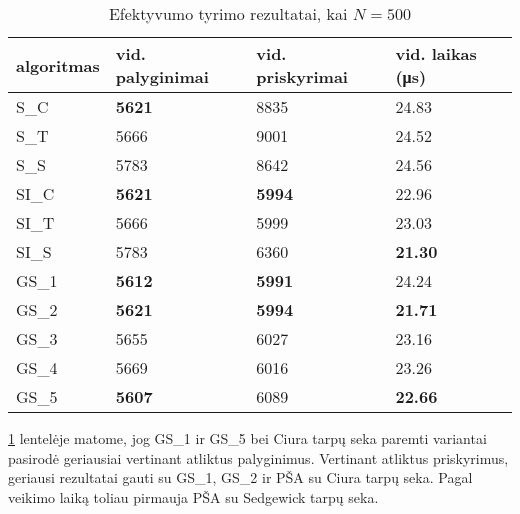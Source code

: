 \documentclass{VUMIFInfKursinis}
\begin{document}
\begin{table}[H]
  \caption{Efektyvumo tyrimo rezultatai, kai $N = 500$}
  \label{results_500}
  \centering
  \begin{tabular}{@{}llll@{}}
  algoritmas & vid. palyginimai                      & vid. priskyrimai                      & vid. laikas (μs)                       \\ \midrule
  S\_C       & \cellcolor[HTML]{70AD47}\textbf{5621} & 8835                                  & 24.83                                  \\
  S\_T       & 5666                                  & 9001                                  & 24.52                                  \\
  S\_S       & 5783                                  & 8642                                  & 24.56                                  \\
  SI\_C      & \cellcolor[HTML]{70AD47}\textbf{5621} & \cellcolor[HTML]{70AD47}\textbf{5994} & 22.96                                  \\
  SI\_T      & 5666                                  & 5999                                  & 23.03                                  \\
  SI\_S      & 5783                                  & 6360                                  & \cellcolor[HTML]{70AD47}\textbf{21.30} \\
  GS\_1      & \cellcolor[HTML]{70AD47}\textbf{5612} & \cellcolor[HTML]{70AD47}\textbf{5991} & 24.24                                  \\
  GS\_2 & \cellcolor[HTML]{70AD47}\textbf{5621} & \cellcolor[HTML]{70AD47}\textbf{5994} & \cellcolor[HTML]{70AD47}\textbf{21.71} \\
  GS\_3      & 5655                                  & 6027                                  & 23.16                                  \\
  GS\_4      & 5669                                  & 6016                                  & 23.26                                  \\
  GS\_5      & \cellcolor[HTML]{70AD47}\textbf{5607} & 6089                                  & \cellcolor[HTML]{70AD47}\textbf{22.66} \\  \bottomrule 
  \end{tabular}
\end{table}


\ref{results_500} lentelėje matome, jog
GS\_1 ir GS\_5 bei Ciura tarpų seka paremti variantai pasirodė geriausiai vertinant atliktus palyginimus.
Vertinant atliktus priskyrimus, geriausi rezultatai gauti su GS\_1, GS\_2 ir PŠA su Ciura tarpų seka.
Pagal veikimo laiką toliau pirmauja PŠA su Sedgewick tarpų seka.
\end{document}

